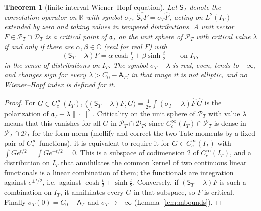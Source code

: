 \documentclass[10pt]{amsart}
\newtheorem{theorem}{Theorem}[section]
\theoremstyle{definition}
\theoremstyle{remark}
\newcommand{\C}{\mathbb C}
\newcommand{\R}{\mathbb R}
\newcommand{\PT}{\mathcal P_T}
\newcommand{\IT}{I_T}
\newcommand{\sT}{\sigma_T}
\newcommand{\Fh}{\widehat F}
\newcommand{\Aconst}{\mathsf A_T}
\begin{document}
\begin{theorem}[finite-interval Wiener--Hopf equation]\label{thm:W}
Let $\mathsf S_T$ denote the convolution operator on $\R$ with symbol $\sT$,
$\widehat{\mathsf S_TF}=\sT\Fh$, acting on $L^2(\IT)$ extended by zero and taking values in tempered
distributions. A unit vector $F\in\PT\cap\mathcal D_T$ is a critical point of $\mathfrak a_T$ on the unit
sphere of $\PT$ with critical value $\lambda$ if and only if there are $\alpha,\beta\in\C$ (real for real
$F$) with
\[
(\mathsf S_T-\lambda)F=\alpha\cosh\tfrac t2+\beta\sinh\tfrac t2\qquad\text{on }\IT,
\]
in the sense of distributions on $\IT$. The symbol $\sT-\lambda$ is real, even, tends to
$+\infty$, and changes sign for every $\lambda>C_0-\Aconst$; in that range it is not elliptic, and no
Wiener--Hopf index is defined for it.
\end{theorem}
\begin{proof}
For $G\in C_c^\infty(\IT)$, $\langle(\mathsf S_T-\lambda)F,G\rangle=\frac1{2\pi}\int(\sT-\lambda)\Fh\,\overline{\widehat G}$
is the polarization of $\mathfrak a_T-\lambda\|\cdot\|^2$. Criticality on the unit sphere of $\PT$
with value $\lambda$ means that this vanishes for all $G$ in $\PT\cap\mathcal D_T$; since
$C_c^\infty(\IT)\cap\PT$ is dense in $\PT\cap\mathcal D_T$ for the form norm (mollify and correct the two
Tate moments by a fixed pair of $C_c^\infty$ functions), it is equivalent to require it for
$G\in C_c^\infty(\IT)$ with $\int Ge^{t/2}=\int Ge^{-t/2}=0$. This is a subspace of codimension $2$
of $C_c^\infty(\IT)$, and a distribution on $\IT$ that annihilates the common kernel of two continuous
linear functionals is a linear combination of them; the functionals are integration against
$e^{\pm t/2}$, i.e.\ against $\cosh\frac t2\pm\sinh\frac t2$. Conversely, if $(\mathsf S_T-\lambda)F$
is such a combination on $\IT$, it annihilates every $G$ in that subspace, so $F$ is critical. Finally
$\sT(0)=C_0-\Aconst$ and $\sT\to+\infty$ (Lemma~\ref{lem:mbounds}).
\end{proof}
\end{document}
